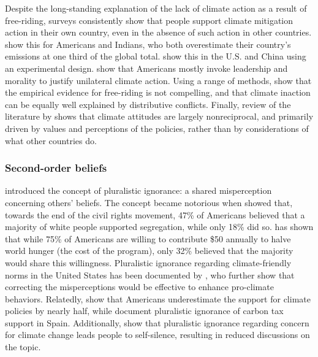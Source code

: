 \documentclass[12pt,english]{article}
\begin{document}
Despite the long-standing explanation of the lack of climate action as a result of free-riding, surveys consistently show that people support climate mitigation action in their own country, even in the absence of such action in other countries. \citet{bernauer_how_2015} show this for Americans and Indians, who both overestimate their country's emissions at one third of the global total. \citet{beiser-mcgrath_commitment_2019} show this in the U.S. and China using an experimental design. \citet{mcevoy_prospects_2016} show that Americans mostly invoke leadership and morality to justify unilateral climate action. Using a range of methods, \citet{aklin_prisoners_2020} show that the empirical evidence for free-riding is not compelling, and that climate inaction can be equally well explained by distributive conflicts. Finally, review of the literature by \citet{mcgrath_how_2017} shows that climate attitudes are largely nonreciprocal, and primarily driven by values and perceptions of the policies, rather than by considerations of what other countries do.

\subsubsection{Second-order beliefs}\label{subsubsec:literature_beliefs}

\citet{allport_social_1924} introduced the concept of pluralistic ignorance: a shared misperception concerning others' beliefs. The concept became notorious when \citet{ogorman_pluralistic_1975} showed that, towards the end of the civil rights movement, 47\% of Americans believed that a majority of white people supported segregation, while only 18\% did so. %
\citet{pipa_americans_2001} has shown that while 75\% of Americans are willing to contribute \$50 annually to halve world hunger (the cost of the program), only 32\% believed that the majority would share this willingness. 
Pluralistic ignorance regarding climate-friendly norms in the United States has been documented by \citet{andre_misperceived_2022}, who further show that correcting the misperceptions would be effective to enhance pro-climate behaviors. Relatedly, \citet{sparkman_americans_2022} show that Americans underestimate the support for climate policies by nearly half, while \citet{drews_biased_2022} document pluralistic ignorance of carbon tax support in Spain. 
Additionally, \citet{geiger_climate_2016} show that pluralistic ignorance regarding concern for climate change leads people to self-silence, resulting in reduced discussions on the topic.
\end{document}
